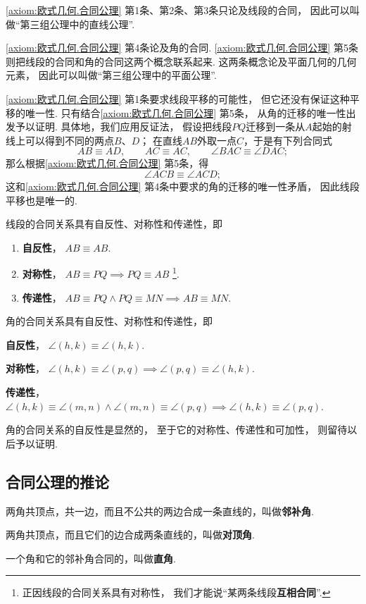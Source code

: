 \cref{axiom:欧式几何.合同公理} 第1条、第2条、第3条只论及线段的合同，%
因此可以叫做“第三组公理中的直线公理”.

\cref{axiom:欧式几何.合同公理} 第4条论及角的合同.
\cref{axiom:欧式几何.合同公理} 第5条则把线段的合同和角的合同这两个概念联系起来.
这两条概念论及平面几何的几何元素，%
因此可以叫做“第三组公理中的平面公理”.

\cref{axiom:欧式几何.合同公理} 第1条要求线段平移的可能性，%
但它还没有保证这种平移的唯一性.
只有结合\cref{axiom:欧式几何.合同公理} 第5条，%
从角的迁移的唯一性出发予以证明.
具体地，我们应用反证法，%
假设把线段\(PQ\)迁移到一条从\(A\)起始的射线上可以得到不同的两点\(B\)、\(D\)；
在直线\(AB\)外取一点\(C\)，于是有下列合同式
\[
AB \equiv AD, \qquad
AC \equiv AC, \qquad
\angle BAC \equiv \angle DAC;
\]
那么根据\cref{axiom:欧式几何.合同公理} 第5条，得
\[
\angle ACB \equiv \angle ACD;
\]
这和\cref{axiom:欧式几何.合同公理} 第4条中要求的角的迁移的唯一性矛盾，%
因此线段平移也是唯一的.

\begin{property}
线段的合同关系具有自反性、对称性和传递性，即
\begin{enumerate}
\item \textbf{自反性}，
\(AB \equiv AB\).

\item \textbf{对称性}，
\(AB \equiv PQ \implies PQ \equiv AB\)
\footnote{%
正因线段的合同关系具有对称性，%
我们才能说“某两条线段\textbf{互相合同}”.
}.

\item \textbf{传递性}，
\(AB \equiv PQ \land PQ \equiv MN \implies AB \equiv MN\).
\end{enumerate}
\end{property}

\begin{property}
角的合同关系具有自反性、对称性和传递性，即
\item \textbf{自反性}，
\(\angle(h,k) \equiv \angle(h,k)\).

\item \textbf{对称性}，
\(\angle(h,k) \equiv \angle(p,q)
\implies
\angle(p,q) \equiv \angle(h,k)\).

\item \textbf{传递性}，
\(\angle(h,k) \equiv \angle(m,n)
\land
\angle(m,n) \equiv \angle(p,q)
\implies
\angle(h,k) \equiv \angle(p,q)\).
\end{property}
角的合同关系的自反性是显然的，%
至于它的对称性、传递性和可加性，%
则留待以后予以证明.

\subsection{合同公理的推论}
\begin{definition}
两角共顶点，共一边，而且不公共的两边合成一条直线的，叫做\textbf{邻补角}.
\end{definition}
\begin{definition}
两角共顶点，而且它们的边合成两条直线的，叫做\textbf{对顶角}.
\end{definition}
\begin{definition}
一个角和它的邻补角合同的，叫做\textbf{直角}.
\end{definition}

